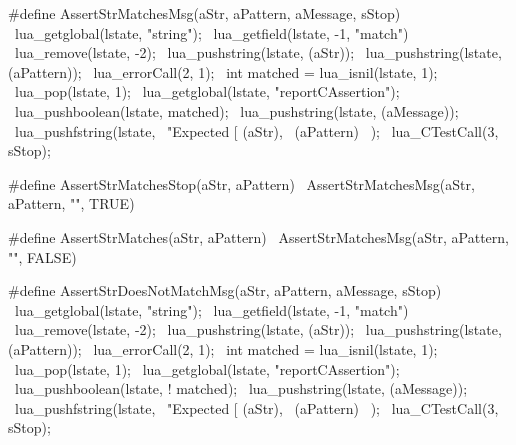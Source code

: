 \startCHeader
#define AssertStrMatchesMsg(aStr, aPattern, aMessage, sStop) \
{                                                            \
  lua_getglobal(lstate, "string");                           \
  lua_getfield(lstate, -1, "match")                          \
  lua_remove(lstate, -2);                                    \
  lua_pushstring(lstate, (aStr));                            \
  lua_pushstring(lstate, (aPattern));                        \
  lua_errorCall(2, 1);                                       \
  int matched = lua_isnil(lstate, 1);                        \
  lua_pop(lstate, 1);                                        \
  lua_getglobal(lstate, "reportCAssertion");                 \
  lua_pushboolean(lstate, matched);                          \
  lua_pushstring(lstate, (aMessage));                        \
  lua_pushfstring(lstate,                                    \
      "Expected [%
      (aStr),                                                \
      (aPattern)                                             \
    );                                                       \
  lua_CTestCall(3, sStop);                                   \
}

#define AssertStrMatchesStop(aStr, aPattern)    \
  AssertStrMatchesMsg(aStr, aPattern, "", TRUE)

#define AssertStrMatches(aStr, aPattern)         \
  AssertStrMatchesMsg(aStr, aPattern, "", FALSE)
\stopCHeader

\stopTestSuite

\startTestSuite[assertStrNotMatch]

\startCHeader
#define AssertStrDoesNotMatchMsg(aStr, aPattern, aMessage, sStop) \
{                                                                 \
  lua_getglobal(lstate, "string");                                \
  lua_getfield(lstate, -1, "match")                               \
  lua_remove(lstate, -2);                                         \
  lua_pushstring(lstate, (aStr));                                 \
  lua_pushstring(lstate, (aPattern));                             \
  lua_errorCall(2, 1);                                            \
  int matched = lua_isnil(lstate, 1);                             \
  lua_pop(lstate, 1);                                             \
  lua_getglobal(lstate, "reportCAssertion");                      \
  lua_pushboolean(lstate, ! matched);                             \
  lua_pushstring(lstate, (aMessage));                             \
  lua_pushfstring(lstate,                                         \
      "Expected [%
      (aStr),                                                     \
      (aPattern)                                                  \
    );                                                            \
  lua_CTestCall(3, sStop);                                        \
}

